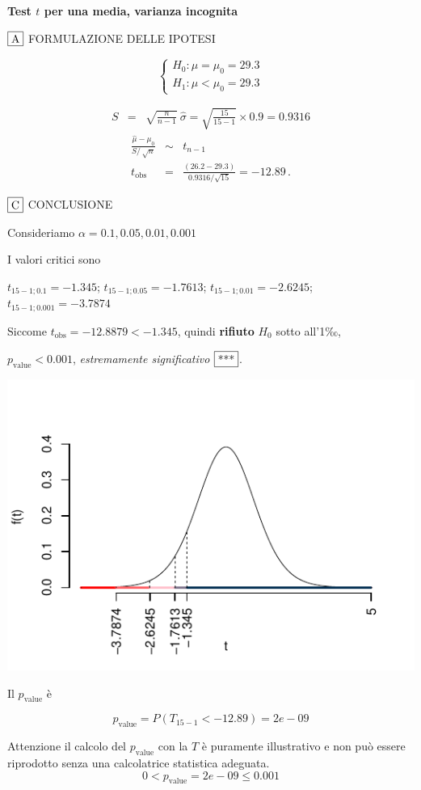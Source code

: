 \documentclass[
  11pt,
]{book}
\theoremstyle{mytheoremstyle}
\theoremstyle{mydefstyle}
\newenvironment{sol}
  {
  \begin{tcolorbox}[enhanced,breakable,arc=0.1mm,boxrule=1pt,colback=white,colframe=iblue,
  title=\bf \fontfamily{lmss}\selectfont \hspace{.5 cm} Soluzione,drop fuzzy shadow]

}{
\end{tcolorbox}
  }
\begin{document}
\begin{sol}
\textbf{Test \(t\) per una media, varianza incognita}

\(\fbox{A}\) FORMULAZIONE DELLE IPOTESI

\[\begin{cases}
   H_0: \mu = \mu_0=29.3 \\
   H_1: \mu < \mu_0=29.3 
   \end{cases}\]

\begin{eqnarray*}
   S    &=& \sqrt{\frac{n} {n-1}}\ \widehat{\sigma} 
   =  \sqrt{\frac{ 15 } { 15 -1}} \times  0.9  =  0.9316 
   \end{eqnarray*}
\begin{eqnarray*}
   \frac{\hat\mu - \mu_{0}} {S/\,\sqrt{n}}&\sim&t_{n-1}\\
   t_{\text{obs}}
   &=& \frac{ ( 26.2 -  29.3 )} { 0.9316 /\sqrt{ 15 }}
   =   -12.89 \, .
   \end{eqnarray*}

\(\fbox{C}\) CONCLUSIONE

Consideriamo \(\alpha=0.1, 0.05, 0.01, 0.001\)

I valori critici sono

\(t_{15-1;0.1}=-1.345\); \(t_{15-1;0.05}=-1.7613\); \(t_{15-1;0.01}=-2.6245\); \(t_{15-1;0.001}=-3.7874\)

Siccome \(t_\text{obs}=-12.8879<-1.345\), quindi \textbf{rifiuto} \(H_0\) sotto all'1‰,

\(p_\text{value}<0.001\), \emph{estremamente significativo} \(\fbox{***}\).

\begin{center}\includegraphics{Esami_passati_con_soluzioni_files/figure-latex/2021-29,-1} \end{center}

Il \(p_{\text{value}}\) è

\[ p_{\text{value}} = P(T_{15-1}<-12.89)=2e-09 \]

Attenzione il calcolo del \(p_\text{value}\) con la \(T\) è puramente illustrativo e non può essere riprodotto senza una calcolatrice statistica adeguata.\[
 0 < p_\text{value}= 2e-09 \leq 0.001 
\]

\end{sol}
\end{document}
